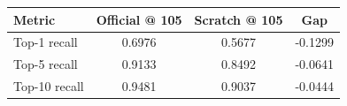 \begin{tabular}{lccc}
\toprule
Metric & Official @ 105 & Scratch @ 105 & Gap \\
\midrule
Top-1 recall & 0.6976 & 0.5677 & -0.1299 \\
Top-5 recall & 0.9133 & 0.8492 & -0.0641 \\
Top-10 recall & 0.9481 & 0.9037 & -0.0444 \\
\bottomrule
\end{tabular}
